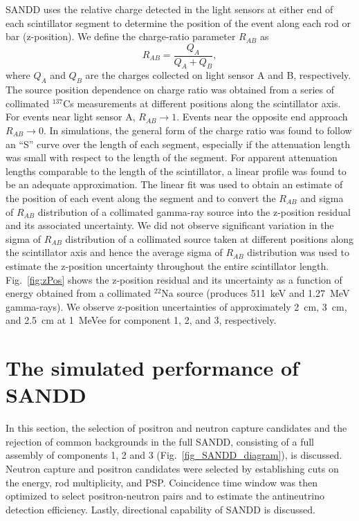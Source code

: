 \documentclass[final,5p,times,twocolumn]{elsarticle}
\begin{document}
SANDD uses the relative charge detected in the light sensors at either end of each scintillator segment to determine the position of the event along each rod or bar (z-position). We define the charge-ratio parameter $R_{AB}$ as
%
\begin{equation} \label{eq_AB_ratio}
    R_{AB} = \frac{Q_{A}}{Q_{A} + Q_{B}},
\end{equation}
%
where $Q_A$ and $Q_B$ are the charges collected on light sensor A and B, respectively. The source position dependence on charge ratio was obtained from a series of collimated $^{137}$Cs measurements at different positions along the scintillator axis.
For events near light sensor A, $R_{AB} \rightarrow 1$. Events near the opposite end approach $R_{AB} \rightarrow 0$. In simulations, the general form of the charge ratio was found to follow an ``S'' curve over the length of each segment, especially if the attenuation length was small with respect to the length of the segment. For apparent attenuation lengths comparable to the length of the scintillator, a linear profile was found to be an adequate approximation. The linear fit was used to obtain an estimate of the position of each event along the segment
and to convert the $R_{AB}$ and sigma of $R_{AB}$ distribution of a collimated gamma-ray source into the z-position residual and its associated uncertainty. 
We did not observe significant variation in the sigma of $R_{AB}$ distribution of a collimated source taken at different positions along the scintillator axis and hence the average sigma of $R_{AB}$ distribution was used to estimate the z-position uncertainty 
throughout the entire scintillator length. Fig.~\ref{fig:zPos} shows the z-position residual and its uncertainty 
as a function of energy obtained from a collimated $^{22}$Na source (produces 511~keV and 1.27~MeV gamma-rays). We observe z-position uncertainties of approximately 2~cm, 3~cm, and 2.5~cm at 1~MeVee for component 1, 2, and 3, respectively.

\section{The simulated performance of SANDD}

In this section, the selection of positron and neutron capture candidates and the rejection of common backgrounds in the full SANDD, consisting of a full assembly of components 1, 2 and 3 (Fig.~\ref{fig_SANDD_diagram}), is discussed. Neutron capture and positron candidates were selected by establishing cuts on the energy, rod multiplicity, and PSP. Coincidence time window was then optimized to select positron-neutron pairs and to estimate the antineutrino detection efficiency. Lastly, directional capability of SANDD is discussed.
\end{document}
